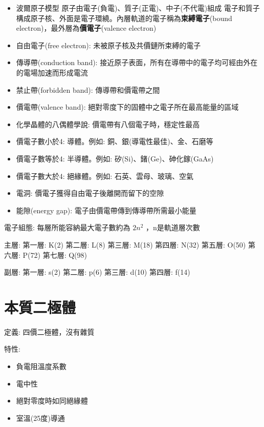 \documentclass[
]{report}
\providecommand{\tightlist}{%
  \setlength{\itemsep}{0pt}\setlength{\parskip}{0pt}}
\begin{document}
\begin{itemize}
\tightlist
\item
  波爾原子模型 原子由電子(負電)、質子(正電)、中子(不代電)組成
  電子和質子構成原子核、外面是電子環繞。內層軌道的電子稱為\textbf{束縛電子}(bound
  electron)，最外層為\textbf{價電子}(valence electron)
\item
  自由電子(free electron): 未被原子核及共價鏈所束縛的電子
\item
  傳導帶(conduction band):
  接近原子表面，所有在導帶中的電子均可經由外在的電場加速而形成電流
\item
  禁止帶(forbidden band): 傳導帶和價電帶之間
\item
  價電帶(valence band): 絕對零度下的固體中之電子所在最高能量的區域
\item
  化學晶體的八偶體學說: 價電帶有八個電子時，穩定性最高
\item
  價電子數小於4: 導體。例如: 銅、銀(導電性最佳)、金、石磨等
\item
  價電子數等於4: 半導體。例如: 矽(Si)、鍺(Ge)、砷化鎵(GaAs)
\item
  價電子數大於4: 絕緣體。例如: 石英、雲母、玻璃、空氣
\item
  電洞: 價電子獲得自由電子後離開而留下的空隙
\item
  能隙(energy gap): 電子由價電帶傳到傳導帶所需最小能量
\end{itemize}

電子組態: 每層所能容納最大電子數約為 \(2n^2\) ，n是軌道層次數

主層: 第一層: K(2) 第二層: L(8) 第三層: M(18) 第四層: N(32) 第五層:
O(50) 第六層: P(72) 第七層: Q(98)

副層: 第一層: s(2) 第二層: p(6) 第三層: d(10) 第四層: f(14)

\hypertarget{ux672cux8ceaux4e8cux6975ux9ad4}{%
\section{本質二極體}\label{ux672cux8ceaux4e8cux6975ux9ad4}}

定義: 四價二極體，沒有雜質

特性:

\begin{itemize}
\tightlist
\item
  負電阻溫度系數
\item
  電中性
\item
  絕對零度時如同絕緣體
\item
  室溫(25度)導通
\end{itemize}
\end{document}
